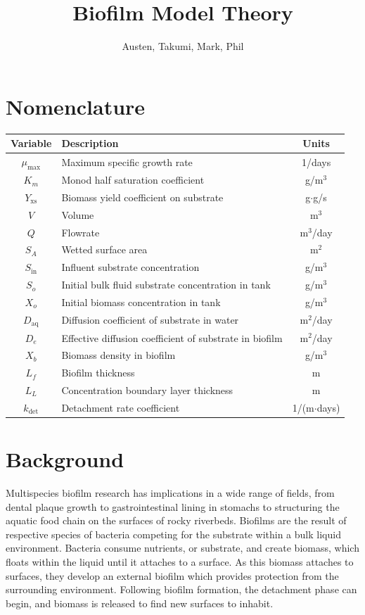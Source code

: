 \documentclass[letterpaper, twoside]{article}
\title{Biofilm Model Theory}
\author{Austen, Takumi, Mark, Phil}
\date{}
\numberwithin{equation}{section}
\begin{document}
\maketitle
{}

\section{Nomenclature}
\begin{tabular}{c l c}
  Variable & Description & Units\\ \hline
  $\mu_\mathrm{max}$  & Maximum specific growth rate & 1/days\\
  $K_m$ & Monod half saturation coefficient & g/m$^3$\\
  $Y_\mathrm{xs}$ & Biomass yield coefficient on substrate & g$\cdot$g/s\\
  $V$ & Volume &m$^3$ \\
  $Q$	& Flowrate & m$^3$/day\\
  $S_A$	& Wetted surface area & m$^2$\\
  $S_{\mathrm{in}}$ & Influent substrate concentration &  g/m$^3$ \\
  $S_o$ & Initial bulk fluid substrate concentration in tank &  g/m$^3$ \\
  $X_o$ & Initial biomass concentration in tank &  g/m$^3$ \\
  $D_\mathrm{aq}$ & Diffusion coefficient of substrate in water & m$^2$/day \\
  $D_e$ & Effective diffusion coefficient of substrate in biofilm & m$^2$/day \\
  $X_b$ & Biomass density in biofilm &  g/m$^3$ \\
  $L_{f}$ & Biofilm thickness & m\\
  $L_L$ & Concentration boundary layer thickness & m \\
  $k_\mathrm{det}$ &	Detachment rate coefficient & 1/(m$\cdot$days)
\end{tabular}

\section{Background}
Multispecies biofilm research has implications in a wide range of fields, from dental plaque growth to gastrointestinal lining in stomachs to structuring the aquatic food chain on the surfaces of rocky riverbeds. Biofilms are the result of respective species of bacteria competing for the substrate within a bulk liquid environment. Bacteria consume nutrients, or substrate, and create biomass, which floats within the liquid until it attaches to a surface. As this biomass attaches to surfaces, they develop an external biofilm which provides protection from the surrounding environment. Following biofilm formation, the detachment phase can begin, and biomass is released to find new surfaces to inhabit.
\end{document}
